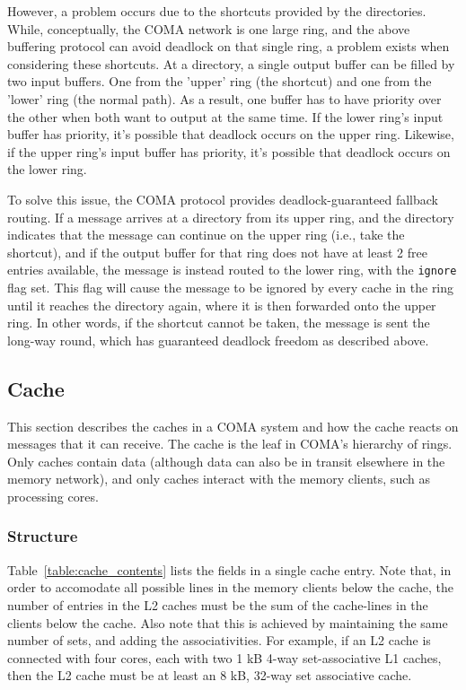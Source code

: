 However, a problem occurs due to the shortcuts provided by the directories. While, conceptually, the COMA network is one large ring, and the above buffering protocol can avoid deadlock on that single ring, a problem exists when considering these shortcuts. At a directory, a single output buffer can be filled by two input buffers. One from the 'upper' ring (the shortcut) and one from the 'lower' ring (the normal path). As a result, one buffer has to have priority over the other when both want to output at the same time. If the lower ring's input buffer has priority, it's possible that deadlock occurs on the upper ring. Likewise, if the upper ring's input buffer has priority, it's possible that deadlock occurs on the lower ring.

To solve this issue, the COMA protocol provides deadlock-guaranteed fallback routing. If a message arrives at a directory from its upper ring, and the directory indicates that the message can continue on the upper ring (i.e., take the shortcut), and if the output buffer for that ring does not have at least 2 free entries available, the message is instead routed to the lower ring, with the {\tt ignore} flag set. This flag will cause the message to be ignored by every cache in the ring until it reaches the directory again, where it is then forwarded onto the upper ring. In other words, if the shortcut cannot be taken, the message is sent the long-way round, which has guaranteed deadlock freedom as described above.




\subsection{Cache}
This section describes the caches in a COMA system and how the cache reacts on messages that it can receive. The cache is the leaf in COMA's hierarchy of rings. Only caches contain data (although data can also be in transit elsewhere in the memory network), and only caches interact with the memory clients, such as processing cores.

\subsubsection{Structure}
Table~\ref{table:cache_contents} lists the fields in a single cache entry. Note that, in order to accomodate all possible lines in the memory clients below the cache, the number of entries in the L2 caches must be the sum of the cache-lines in the clients below the cache. Also note that this is achieved by maintaining the same number of sets, and adding the associativities. For example, if an L2 cache is connected with four cores, each with two 1 kB 4-way set-associative L1 caches, then the L2 cache must be at least an 8 kB, 32-way set associative cache.

